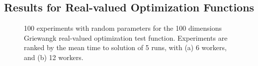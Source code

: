 \documentclass[conference]{IEEEtran}
\begin{document}
\subsection{Results for Real-valued Optimization Functions}
%
\begin{figure}[t]
    \centering

    \caption{100 experiments with random parameters for the 100 dimensions Griewangk
    real-valued optimization test function. Experiments are ranked by
    the mean time to solution of 5 runs, with (a) 6 workers, and (b) 12 workers.}
    \label{fig:griewank}
\end{figure}
%
\end{document}

